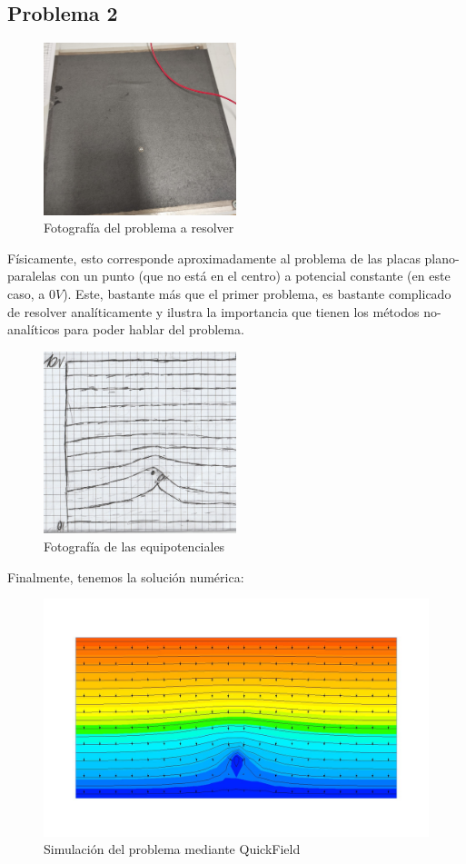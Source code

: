 \documentclass[a4paper,12pt]{article}
\begin{document}
\pagebreak 
\subsection{Problema 2}
\begin{figure}[h!]
\centering
	\caption{Fotografía del problema a resolver}
	\includegraphics[width=0.5\textwidth]{Prob2pic.jpeg}
\end{figure}
Físicamente, esto corresponde aproximadamente al problema de las placas plano-paralelas con un punto (que no está en el centro) a potencial constante (en este caso, a $0V$). Este, bastante más que el primer problema, es bastante complicado de resolver analíticamente y ilustra la importancia que tienen los métodos no-analíticos para poder hablar del problema.
\begin{figure}[h!]
\centering
	\caption{Fotografía de las equipotenciales}
	\includegraphics[width=0.5\textwidth]{problem2equi.jpg}
\end{figure}

Finalmente, tenemos la solución numérica:

\begin{figure}[H]
\centering
	\caption{Simulación del problema mediante QuickField}
	\includegraphics[width=1\textwidth]{problem 2.jpg}
\end{figure}
\end{document}
